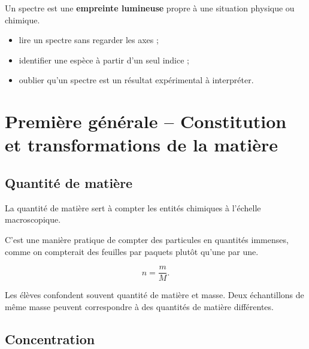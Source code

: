\documentclass[11pt,a4paper]{article}
\begin{document}
\begin{imagem}
Un spectre est une \textbf{empreinte lumineuse} propre à une situation physique ou chimique.
\end{imagem}

\begin{erreurs}
\begin{itemize}
    \item lire un spectre sans regarder les axes ;
    \item identifier une espèce à partir d'un seul indice ;
    \item oublier qu'un spectre est un résultat expérimental à interpréter.
\end{itemize}
\end{erreurs}

\newpage

\section{Première générale -- Constitution et transformations de la matière}

\subsection{Quantité de matière}

\begin{sens}
La quantité de matière sert à compter les entités chimiques à l'échelle macroscopique.
\end{sens}

\begin{imagem}
C'est une manière pratique de compter des particules en quantités immenses,
comme on compterait des feuilles par paquets plutôt qu'une par une.
\end{imagem}

\begin{bilan}
\[
n=\frac{m}{M}.
\]
\end{bilan}

\begin{fausseintuition}
Les élèves confondent souvent quantité de matière et masse.
Deux échantillons de même masse peuvent correspondre à des quantités de matière différentes.
\end{fausseintuition}

\subsection{Concentration}
\end{document}
